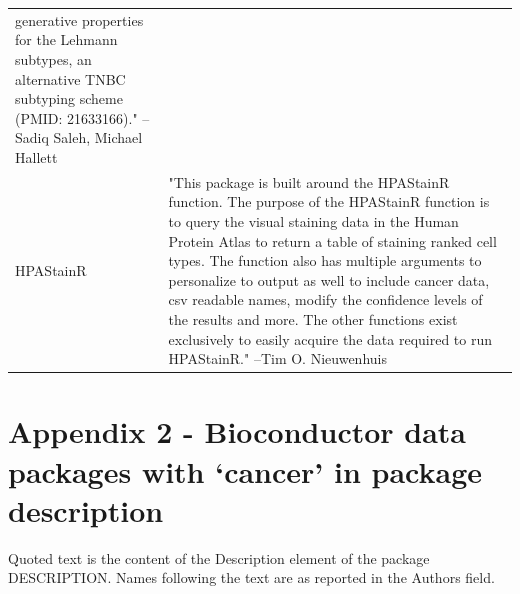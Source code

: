 \documentclass[]{article}
\begin{document}
\begin{longtable}[t]{l>{\raggedright\arraybackslash}p{25em}}
generative properties for the Lehmann subtypes, an alternative
TNBC subtyping scheme (PMID: 21633166)." --Sadiq Saleh, Michael Hallett\\
HPAStainR & "This package is built around the HPAStainR function. The
purpose of the HPAStainR function is to query the visual
staining data in the Human Protein Atlas to return a table of
staining ranked cell types. The function also has multiple
arguments to personalize to output as well to include cancer
data, csv readable names, modify the confidence levels of the
results and more. The other functions exist exclusively to
easily acquire the data required to run HPAStainR." --Tim O. Nieuwenhuis\\
\bottomrule
\end{longtable}

\newpage

\hypertarget{app2}{%
\section{Appendix 2 - Bioconductor data packages with `cancer' in package description}\label{app2}}

Quoted text is the content of the Description element of the package DESCRIPTION. Names following the
text are as reported in the Authors field.
\end{document}
